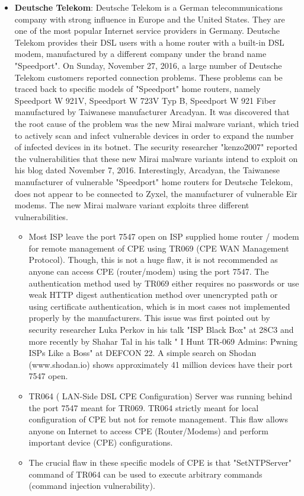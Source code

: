 \documentclass[conference]{IEEEtran}
\begin{document}
\begin{itemize}
\item{\textbf{Deutsche Telekom}: Deutsche Telekom is a German telecommunications company with strong influence in Europe and the United States. They are one of the most popular Internet service providers in Germany. Deutsche Telekom provides their DSL users with a home router with a built-in DSL modem, manufactured by a different company under the brand name "Speedport". On Sunday, November 27, 2016, a large number of Deutsche Telekom customers reported connection problems. These problems can be traced back to specific models of "Speedport" home routers, namely Speedport W 921V, Speedport W 723V Typ B, Speedport W 921 Fiber manufactured by Taiwanese manufacturer Arcadyan. It was discovered that the root cause of the problem was the new Mirai malware variant, which tried to actively scan and infect vulnerable devices in order to expand the number of infected devices in its botnet. The security researcher "kenzo2007" reported the vulnerabilities that these new Mirai malware variants intend to exploit on his blog dated November 7, 2016. Interestingly, Arcadyan, the Taiwanese manufacturer of vulnerable "Speedport" home routers for Deutsche Telekom, does not appear to be connected to Zyxel, the manufacturer of vulnerable Eir modems. The new Mirai malware variant exploits three different vulnerabilities.
\begin{itemize}
\item{Most ISP leave the port 7547 open on ISP supplied home
router / modem for remote management of CPE using
TR069 (CPE WAN Management Protocol). Though, this
is not a huge flaw, it is not recommended as anyone can
access CPE (router/modem) using the port 7547. The
authentication method used by TR069 either requires
no passwords or use weak HTTP digest authentication
method over unencrypted path or using certificate authentication,
which is in most cases not implemented
properly by the manufacturers. This issue was first
pointed out by security researcher Luka Perkov in his
talk "ISP Black Box" at 28C3 and more recently by
Shahar Tal in his talk " I Hunt TR-069 Admins: Pwning
ISPs Like a Boss" at DEFCON 22. A simple search
on Shodan (www.shodan.io) shows approximately 41
million devices have their port 7547 open.\cite{b2}

}
\item{
TR064 ( LAN-Side DSL CPE Configuration) Server was
running behind the port 7547 meant for TR069. TR064
strictly meant for local configuration of CPE but not
for remote management. This flaw allows anyone on
Internet to access CPE (Router/Modems) and perform
important device (CPE) configurations.\cite{b2}}
\item{
The crucial flaw in these specific models of CPE is
that "SetNTPServer" command of TR064 can be used
to execute arbitrary commands (command injection vulnerability).\cite{b2}}
\end{itemize}


}
\end{itemize}
\end{document}
